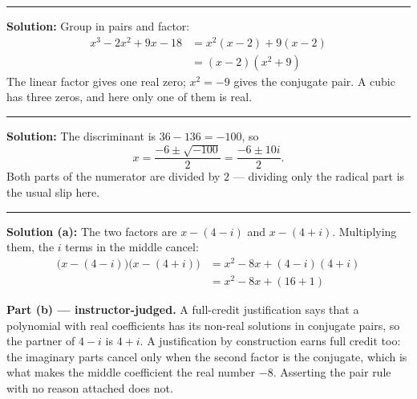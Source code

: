 \documentclass[12pt]{article}
\begin{document}
\vspace{0.15cm}
\noindent\rule{\linewidth}{0.2pt}


\textbf{Solution:} Group in pairs and factor:
\begin{align*}
  x^{3} - 2x^{2} + 9x - 18 &= x^{2}(x - 2) + 9(x - 2) \\
                           &= (x - 2)(x^{2} + 9)
\end{align*}
The linear factor gives one real zero; $x^{2} = -9$ gives the conjugate pair.
A cubic has three zeros, and here only one of them is real. 

\vspace{0.15cm}
\noindent\rule{\linewidth}{0.2pt}


\textbf{Solution:} The discriminant is $36 - 136 = -100$, so
\[
  x = \frac{-6 \pm \sqrt{-100}}{2} = \frac{-6 \pm 10i}{2}.
\]
Both parts of the numerator are divided by $2$ --- dividing only the radical
part is the usual slip here. 

\vspace{0.15cm}
\noindent\rule{\linewidth}{0.2pt}


\textbf{Solution (a):} The two factors are $x - (4 - i)$ and $x - (4 + i)$.
Multiplying them, the $i$ terms in the middle cancel:
\begin{align*}
  \bigl(x - (4 - i)\bigr)\bigl(x - (4 + i)\bigr)
    &= x^{2} - 8x + (4 - i)(4 + i) \\
    &= x^{2} - 8x + (16 + 1)
\end{align*}

\textbf{Part (b) --- instructor-judged.} A full-credit justification says that a
polynomial with real coefficients has its non-real solutions in conjugate pairs,
so the partner of $4 - i$ is $4 + i$. A justification by construction earns full
credit too: the imaginary parts cancel only when the second factor is the
conjugate, which is what makes the middle coefficient the real number $-8$.
Asserting the pair rule with no reason attached does not.
\end{document}
